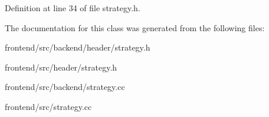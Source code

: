 Definition at line 34 of file strategy.\-h.



The documentation for this class was generated from the following files\-:\begin{DoxyCompactItemize}
\item 
frontend/src/backend/header/strategy.\-h\item 
frontend/src/header/strategy.\-h\item 
frontend/src/backend/strategy.\-cc\item 
frontend/src/strategy.\-cc\end{DoxyCompactItemize}
